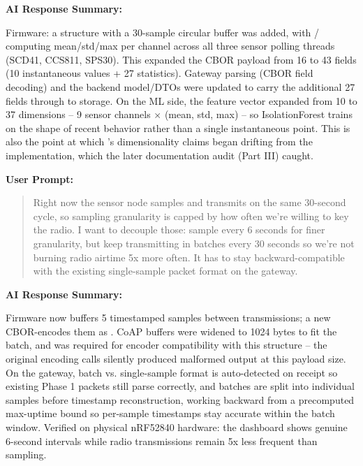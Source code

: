 \documentclass[conference]{IEEEtran}
\begin{document}
\noindent\textbf{AI Response Summary:}\par

Firmware: a \texttt{} structure with a 30-sample circular buffer was added, with \texttt{}/\texttt{} computing mean/std/max per channel across all three sensor polling threads (SCD41, CCS811, SPS30). This expanded the CBOR payload from 16 to 43 fields (10 instantaneous values + 27 statistics). Gateway parsing (CBOR field decoding) and the backend \texttt{} model/DTOs were updated to carry the additional 27 fields through to storage. On the ML side, the feature vector expanded from 10 to 37 dimensions -- 9 sensor channels $\times$ (mean, std, max) -- so IsolationForest trains on the shape of recent behavior rather than a single instantaneous point. This is also the point at which \texttt{}'s dimensionality claims began drifting from the implementation, which the later documentation audit (Part III) caught.

\par\vspace{4pt}\par\vspace{2pt}

\noindent\textbf{User Prompt:}\par

\begin{quote}
Right now the sensor node samples and transmits on the same 30-second cycle, so sampling granularity is capped by how often we're willing to key the radio. I want to decouple those: sample every 6 seconds for finer granularity, but keep transmitting in batches every 30 seconds so we're not burning radio airtime 5x more often. It has to stay backward-compatible with the existing single-sample packet format on the gateway.
\end{quote}

\noindent\textbf{AI Response Summary:}\par

Firmware now buffers 5 timestamped samples between transmissions; a new \texttt{} CBOR-encodes them as \texttt{}. CoAP buffers were widened to 1024 bytes to fit the batch, and \texttt{} was required for encoder compatibility with this structure -- the original encoding calls silently produced malformed output at this payload size. On the gateway, batch vs. single-sample format is auto-detected on receipt so existing Phase 1 packets still parse correctly, and batches are split into individual samples before timestamp reconstruction, working backward from a precomputed max-uptime bound so per-sample timestamps stay accurate within the batch window. Verified on physical nRF52840 hardware: the dashboard shows genuine 6-second intervals while radio transmissions remain 5x less frequent than sampling.
\end{document}
